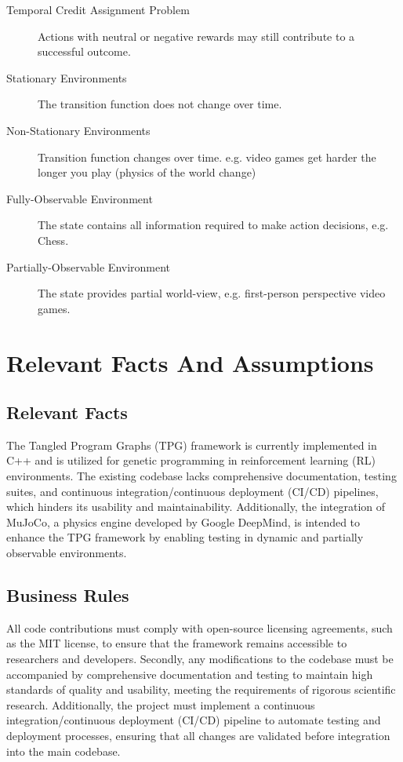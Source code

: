\documentclass[12pt]{article}
\begin{document}
\begin{description}
  \item [Temporal Credit Assignment Problem]\label{def:temporal_credit} Actions with neutral or negative rewards may still contribute to a successful outcome.
  \item [Stationary Environments]\label{def:stationary_env} The transition function does not change over time.
  \item [Non-Stationary Environments]\label{def:nonstationary_env} Transition function changes over time. e.g. video games get harder the longer you play (physics of the world change)
  \item [Fully-Observable Environment]\label{fully_obs_env} The state contains all information required to make action decisions, e.g. Chess.
  \item [Partially-Observable Environment]\label{partial_obs_env} The state provides partial world-view, e.g. first-person perspective video games.
\end{description}

\section{Relevant Facts And Assumptions}
\subsection{Relevant Facts}
The Tangled Program Graphs (TPG) framework is currently implemented in C++ and is utilized for genetic programming in reinforcement learning (RL) environments. The existing codebase lacks comprehensive documentation, testing suites, and continuous integration/continuous deployment (CI/CD) pipelines, which hinders its usability and maintainability. Additionally, the integration of MuJoCo, a physics engine developed by Google DeepMind, is intended to enhance the TPG framework by enabling testing in dynamic and partially observable environments.

\subsection{Business Rules}
All code contributions must comply with open-source licensing agreements, such as the MIT license, to ensure that the framework remains accessible to researchers and developers. Secondly, any modifications to the codebase must be accompanied by comprehensive documentation and testing to maintain high standards of quality and usability, meeting the requirements of rigorous scientific research. Additionally, the project must implement a continuous integration/continuous deployment (CI/CD) pipeline to automate testing and deployment processes, ensuring that all changes are validated before integration into the main codebase.
\end{document}
